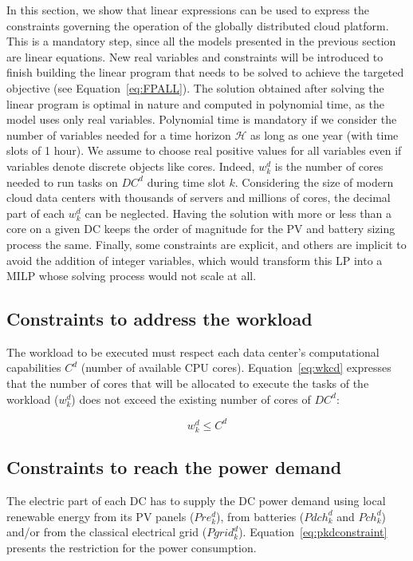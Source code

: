 In this section, we show that linear expressions can be used to express the constraints governing the operation of the globally distributed cloud platform. This is a mandatory step, since all the models presented in the previous section are linear equations. New real variables and constraints will be introduced to finish building the linear program that needs to be solved to achieve the targeted objective (see Equation~\eqref{eq:FPALL}). The solution obtained after solving the linear program is optimal in nature and computed in polynomial time, as the model uses only real variables. Polynomial time is mandatory if we consider the number of variables needed for a time horizon $\mathcal{H}$ as long as one year (with time slots of 1 hour). We assume to choose real positive values for all variables even if variables denote discrete objects like cores. Indeed, $w_k^d$ is the number of cores needed to run tasks on $DC^d$ during time slot $k$. Considering the size of modern cloud data centers with thousands of servers and millions of cores, the decimal part of each $w_k^d$ can be neglected. Having the solution with more or less than a core on a given DC keeps the order of magnitude for the PV and battery sizing process the same. Finally, some constraints are explicit, and others are implicit to avoid the addition of integer variables, which would transform this LP into a MILP whose solving process would not scale at all.


\subsection{Constraints to address the workload}

The workload to be executed must respect each data center's computational capabilities $C^d$ (number of available CPU cores). Equation~\eqref{eq:wkcd} expresses that the number of cores that will be allocated to execute the tasks of the workload ($w_k^d$) does not exceed the existing number of cores of $DC^d$:

\begin{equation}\label{eq:wkcd}
    w_k^d \leq C^d
\end{equation}


\subsection{Constraints to reach the power demand}

The electric part of each DC has to supply the DC power demand using local renewable energy from its PV panels ($Pre_k^d$), from batteries ($Pdch_k^d$ and $Pch_k^d$) and/or from the classical electrical grid ($Pgrid_k^d$). Equation~\eqref{eq:pkdconstraint} presents the restriction for the power consumption.

